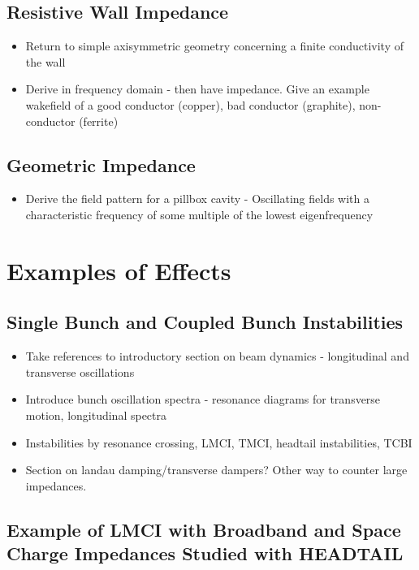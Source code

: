 \subsection{Resistive Wall Impedance}

\begin{itemize}
\item{Return to simple axisymmetric geometry concerning a finite conductivity of the wall}
\item{Derive in frequency domain - then have impedance. Give an example wakefield of a good conductor (copper), bad conductor (graphite), non-conductor (ferrite)}
\end{itemize}

\subsection{Geometric Impedance}
\begin{itemize}
\item{Derive the field pattern for a pillbox cavity - Oscillating fields with a characteristic frequency of some multiple of the lowest eigenfrequency}
\end{itemize}
\section{Examples of Effects}



\subsection{Single Bunch and Coupled Bunch Instabilities}

\begin{itemize}
\item{Take references to introductory section on beam dynamics - longitudinal and transverse oscillations}
\item{Introduce bunch oscillation spectra - resonance diagrams for transverse motion, longitudinal spectra}
\item{Instabilities by resonance crossing, LMCI, TMCI, headtail instabilities, TCBI}
\item{Section on landau damping/transverse dampers? Other way to counter large impedances.}
\end{itemize}

\subsection{Example of LMCI with Broadband and Space Charge Impedances Studied with HEADTAIL}

%
%